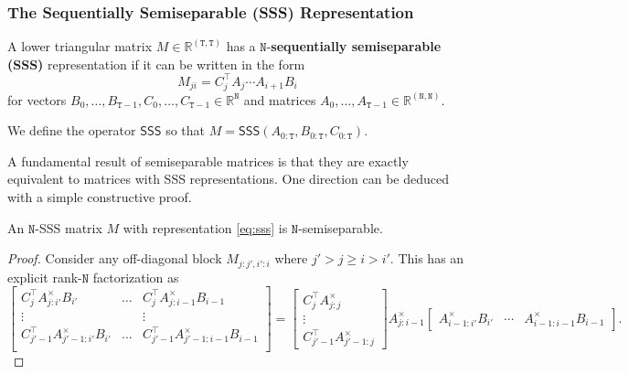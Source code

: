 \subsubsection{The Sequentially Semiseparable (SSS) Representation}

\begin{definition}
  \label{def:sss}
  A lower triangular matrix $M \in \mathbb{R}^{\mathtt{(T,T)}}$ has a $\mathtt{N}$-\textbf{sequentially semiseparable (SSS)} representation if it can be written in the form
  \begin{equation}
    \label{eq:sss}
    M_{ji} = C_j^{\top} A_{j} \cdots A_{i+1} B_{i}
  \end{equation}
  for vectors $B_{0}, \dots, B_{\mathtt{T}-1}, C_{0}, \dots, C_{\mathtt{T}-1} \in \mathbb{R}^{\mathtt{N}}$
  and matrices $A_{0}, \dots, A_{\mathtt{T}-1} \in \mathbb{R}^{\mathtt{(N,N)}}$.

  We define the operator $\mathsf{SSS}$ so that $M = \mathsf{SSS}(A_{0:\mathtt{T}}, B_{0:\mathtt{T}}, C_{0:\mathtt{T}})$.
\end{definition}

A fundamental result of semiseparable matrices is that they are exactly equivalent to matrices with SSS representations. One direction can be deduced with a simple constructive proof.

\begin{lemma}
  \label{lmm:sss-rank-factor}
  An $\mathtt{N}$-SSS matrix $M$ with representation \eqref{eq:sss} is $\mathtt{N}$-semiseparable.
\end{lemma}

\begin{proof}
  Consider any off-diagonal block $M_{j:j', i':i}$ where $j' > j \ge i > i'$. This has an explicit rank-$\mathtt{N}$ factorization as
  \begin{equation}
    \label{eq:sss-rank-factor}
    \begin{bmatrix}
      C_j^{\top} A_{j:i'}^\times B_{i'}         & \dots & C_j^{\top} A_{j:i-1}^\times B_{i-1}   \\
      \vdots                                    &       &       \vdots      \\
      C_{j'-1}^{\top} A_{j'-1:i'}^\times B_{i'} & \dots & C_{j'-1}^{\top} A_{j'-1:i-1}^\times B_{i-1} \\
    \end{bmatrix}
    =
    \begin{bmatrix} C_j^{\top} A_{j:j}^\times \\ \vdots \\ C_{j'-1}^{\top} A_{j'-1:j}^\times \end{bmatrix}
    A_{j:i-1}^\times
    \begin{bmatrix} A_{i-1:i'}^\times B_{i'} & \cdots & A_{i-1:i-1}^\times B_{i-1} \end{bmatrix}
    .
  \end{equation}
\end{proof}


